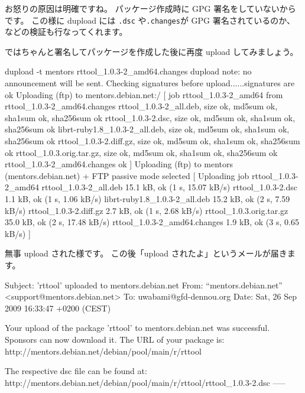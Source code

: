 \documentclass[mingoth,a4paper]{jsarticle}
\begin{document}
お怒りの原因は明確ですね。 パッケージ作成時に GPG 署名をしていないからです。
この様に dupload には {\tt .dsc} や{\tt .changes}が GPG 署名されているのか、
などの検証も行なってくれます。

ではちゃんと署名してパッケージを作成した後に再度 upload してみましょう。
\begin{commandline}
dupload -t mentors rttool_1.0.3-2_amd64.changes
dupload note: no announcement will be sent.
Checking signatures before upload......signatures are ok
Uploading (ftp) to mentors.debian.net:/
[ job rttool_1.0.3-2_amd64 from rttool_1.0.3-2_amd64.changes
 rttool_1.0.3-2_all.deb, size ok, md5sum ok, sha1sum ok, sha256sum ok
 rttool_1.0.3-2.dsc, size ok, md5sum ok, sha1sum ok, sha256sum ok
 librt-ruby1.8_1.0.3-2_all.deb, size ok, md5sum ok, sha1sum ok, sha256sum ok
 rttool_1.0.3-2.diff.gz, size ok, md5sum ok, sha1sum ok, sha256sum ok
 rttool_1.0.3.orig.tar.gz, size ok, md5sum ok, sha1sum ok, sha256sum ok
 rttool_1.0.3-2_amd64.changes ok ]
Uploading (ftp) to mentors (mentors.debian.net)
+ FTP passive mode selected
[ Uploading job rttool_1.0.3-2_amd64
 rttool_1.0.3-2_all.deb 15.1 kB, ok (1 s, 15.07 kB/s)
 rttool_1.0.3-2.dsc 1.1 kB, ok (1 s, 1.06 kB/s)
 librt-ruby1.8_1.0.3-2_all.deb 15.2 kB, ok (2 s, 7.59 kB/s)
 rttool_1.0.3-2.diff.gz 2.7 kB, ok (1 s, 2.68 kB/s)
 rttool_1.0.3.orig.tar.gz 35.0 kB, ok (2 s, 17.48 kB/s)
 rttool_1.0.3-2_amd64.changes 1.9 kB, ok (3 s, 0.65 kB/s) ]
\end{commandline}
無事 upload された様です。
この後「upload されたよ」というメールが届きます。
\begin{commandline}
Subject: 'rttool' uploaded to mentors.debian.net
From: ``mentors.debian.net'' <support@mentors.debian.net>
To: uwabami@gfd-dennou.org
Date: Sat, 26 Sep 2009 16:33:47 +0200 (CEST)

Your upload of the package 'rttool' to mentors.debian.net was
successful. Sponsors can now download it. The URL of your package is:
http://mentors.debian.net/debian/pool/main/r/rttool

The respective dsc file can be found at:
http://mentors.debian.net/debian/pool/main/r/rttool/rttool_1.0.3-2.dsc
-----
\end{commandline}
\end{document}
